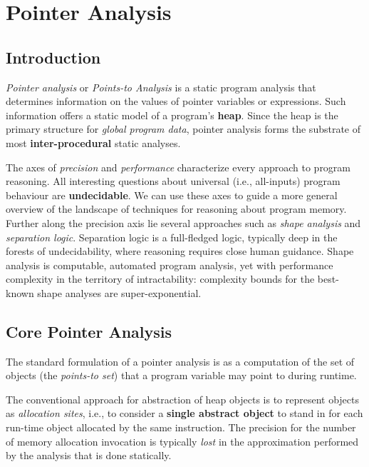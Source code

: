 
\chapter{Pointer Analysis}
\label{chap:pointer-analysis}

\section{Introduction}

\textit{Pointer analysis} or \textit{Points-to Analysis} is a static
program analysis that determines information on the values of pointer
variables or expressions.  Such information offers a static model of a
program's \textbf{heap}.  Since the heap is the primary structure for
\textit{global program data}, pointer analysis forms the substrate of
most \textbf{inter-procedural} static analyses.


The axes of \textit{precision} and \textit{performance} characterize
every approach to program reasoning. All interesting questions about
universal (i.e., all-inputs) program behaviour are
\textbf{undecidable}. We can use these axes to guide a more general
overview of the landscape of techniques for reasoning about program
memory. Further along the precision axis lie several approaches such
as \textit{shape analysis} and \textit{separation logic}. Separation
logic is a full-fledged logic, typically deep in the forests of
undecidability, where reasoning requires close human guidance. Shape
analysis is computable, automated program analysis, yet with
performance complexity in the territory of intractability: complexity
bounds for the best-known shape analyses are super-exponential.


\section{Core Pointer Analysis}

The standard formulation of a pointer analysis is as a computation of
the set of objects (the \textit{points-to set}) that a program
variable may point to during runtime.


The conventional approach for abstraction of heap objects is to
represent objects as \textit{allocation sites}, i.e., to consider a
\textbf{single abstract object} to stand in for each run-time object
allocated by the same instruction. The precision for the number of
memory allocation invocation is typically \textit{lost} in the
approximation performed by the analysis that is done statically.



